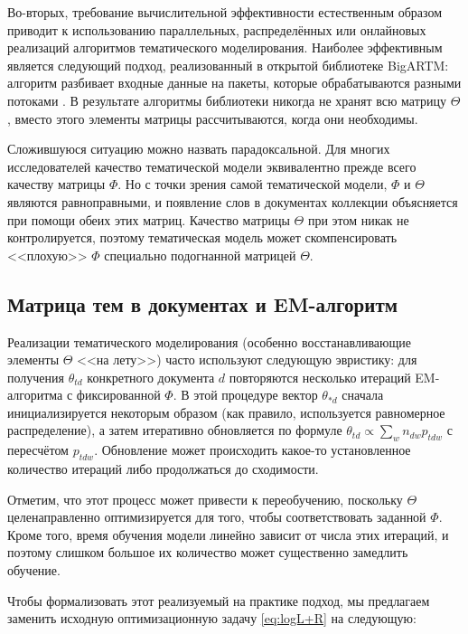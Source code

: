 Во-вторых, требование вычислительной эффективности естественным образом приводит к использованию параллельных, распределённых или онлайновых реализаций алгоритмов тематического моделирования. Наиболее эффективным является следующий подход, реализованный в открытой библиотеке BigARTM: алгоритм разбивает входные данные на пакеты, которые обрабатываются разными потоками \cite{frei2016parallel}. В результате алгоритмы библиотеки никогда не хранят всю матрицу $\Theta$, вместо этого элементы матрицы рассчитываются, когда они необходимы.

Сложившуюся ситуацию можно назвать парадоксальной. Для многих исследователей качество тематической модели эквивалентно прежде всего качеству матрицы $\Phi$. Но с точки зрения самой тематической модели, $\Phi$ и $\Theta$ являются равноправными, и появление слов в документах коллекции объясняется при помощи обеих этих матриц. Качество матрицы $\Theta$ при этом никак не контролируется, поэтому тематическая модель может скомпенсировать <<плохую>> $\Phi$ специально подогнанной матрицей $\Theta$.

\subsection{Матрица тем в документах и EM-алгоритм}

\label{sec:theta_inference}

Реализации тематического моделирования (особенно  восстанавливающие элементы $\Theta$ <<на лету>>) часто используют следующую эвристику: для получения $\theta_{td}$ конкретного документа $d$ повторяются несколько итераций EM-алгоритма с фиксированной $\Phi$. В этой процедуре вектор $\theta_{\ast d}$ сначала инициализируется некоторым образом (как правило, используется равномерное распределение), а затем итеративно обновляется по формуле $\theta_{td}  \propto \sum_{w} n_{dw} p_{tdw}$ с пересчётом $p_{tdw}$. Обновление может происходить какое-то установленное количество итераций либо продолжаться до сходимости.

Отметим, что этот процесс может привести к переобучению, поскольку $\Theta$ целенаправленно оптимизируется для того, чтобы соответствовать заданной $\Phi$. Кроме того, время обучения модели линейно зависит от числа этих итераций, и поэтому слишком большое их количество может существенно замедлить обучение.

Чтобы формализовать этот реализуемый на практике подход, мы предлагаем заменить исходную оптимизационную задачу \ref{eq:logL+R} на следующую:

